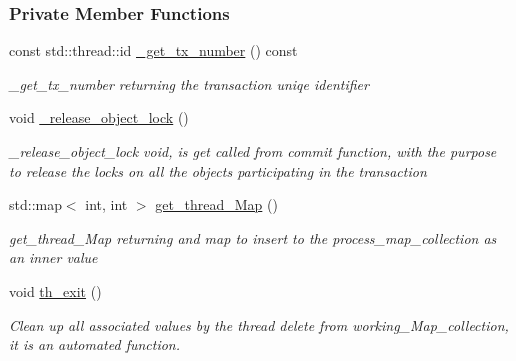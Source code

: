 \subsubsection*{Private Member Functions}
\begin{DoxyCompactItemize}
\item 
const std\+::thread\+::id \hyperlink{class_t_x_a9eba04944d449285905b60ec47223cff_a9eba04944d449285905b60ec47223cff}{\+\_\+get\+\_\+tx\+\_\+number} () const 
\begin{DoxyCompactList}\small\item\em \+\_\+get\+\_\+tx\+\_\+number returning the transaction uniqe identifier \end{DoxyCompactList}\item 
void \hyperlink{class_t_x_a4c13d2015dc15d0f788fa9a1413f0463_a4c13d2015dc15d0f788fa9a1413f0463}{\+\_\+release\+\_\+object\+\_\+lock} ()
\begin{DoxyCompactList}\small\item\em \+\_\+release\+\_\+object\+\_\+lock void, is get called from commit function, with the purpose to release the locks on all the objects participating in the transaction \end{DoxyCompactList}\item 
std\+::map$<$ int, int $>$ \hyperlink{class_t_x_a3f5671423cb7b9f9c98f8a25f2a4b545_a3f5671423cb7b9f9c98f8a25f2a4b545}{get\+\_\+thread\+\_\+\+Map} ()
\begin{DoxyCompactList}\small\item\em get\+\_\+thread\+\_\+\+Map returning and map to insert to the process\+\_\+map\+\_\+collection as an inner value \end{DoxyCompactList}\item 
void \hyperlink{class_t_x_ae045534c4a9d39bd5c6ea2a39a372a79_ae045534c4a9d39bd5c6ea2a39a372a79}{th\+\_\+exit} ()
\begin{DoxyCompactList}\small\item\em Clean up all associated values by the thread delete from working\+\_\+\+Map\+\_\+collection, it is an automated function. \end{DoxyCompactList}\end{DoxyCompactItemize}
